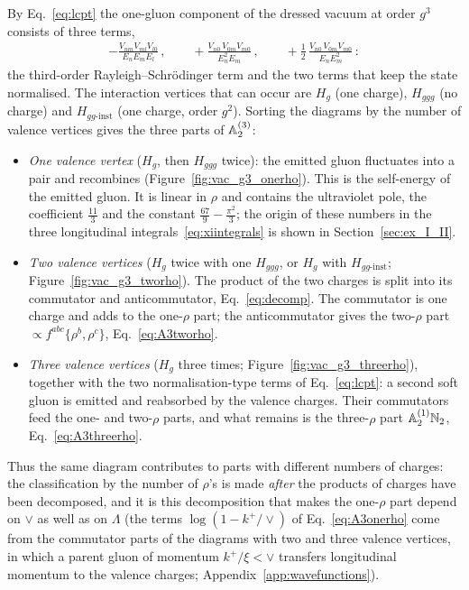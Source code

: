 By Eq.~\eqref{eq:lcpt} the one-gluon component of the dressed vacuum at order $g^3$ consists of three terms,
\begin{align}\label{eq:thirdorder}
-\frac{V_{nm}V_{ml}V_{l0}}{E_nE_mE_l}\,,\qquad+\frac{V_{n0}\,V_{0m}V_{m0}}{E_n^2E_m}\,,\qquad+\frac12\,\frac{V_{n0}\,V_{0m}V_{m0}}{E_nE_m^2}\,:
\end{align}
the third-order Rayleigh--Schr\"odinger term and the two terms that keep the state normalised. The interaction vertices that can occur are $H_g$ (one charge), $H_{ggg}$ (no charge) and $H_{gg\text{-inst}}$ (one charge, order $g^2$). Sorting the diagrams by the number of valence vertices gives the three parts of $\mathbb{A}^{(3)}_2$:
\begin{itemize}
\item \emph{One valence vertex} ($H_g$, then $H_{ggg}$ twice): the emitted gluon fluctuates into a pair and recombines (Figure~\ref{fig:vac_g3_onerho}). This is the self-energy of the emitted gluon. It is linear in $\rho$ and contains the ultraviolet pole, the coefficient $\frac{11}{3}$ and the constant $\frac{67}{9}-\frac{\pi^2}{3}$; the origin of these numbers in the three longitudinal integrals~\eqref{eq:xiintegrals} is shown in Section~\ref{sec:ex_I_II}.
\item \emph{Two valence vertices} ($H_g$ twice with one $H_{ggg}$, or $H_g$ with $H_{gg\text{-inst}}$; Figure~\ref{fig:vac_g3_tworho}). The product of the two charges is split into its commutator and anticommutator, Eq.~\eqref{eq:decomp}. The commutator is one charge and adds to the one-$\rho$ part; the anticommutator gives the two-$\rho$ part $\propto f^{abc}\{\rho^b,\rho^c\}$, Eq.~\eqref{eq:A3tworho}.
\item \emph{Three valence vertices} ($H_g$ three times; Figure~\ref{fig:vac_g3_threerho}), together with the two normalisation-type terms of Eq.~\eqref{eq:lcpt}: a second soft gluon is emitted and reabsorbed by the valence charges. Their commutators feed the one- and two-$\rho$ parts, and what remains is the three-$\rho$ part $\mathbb{A}^{(1)}_2\mathbb{N}_2$, Eq.~\eqref{eq:A3threerho}.
\end{itemize}
Thus the same diagram contributes to parts with different numbers of charges: the classification by the number of $\rho$'s is made \emph{after} the products of charges have been decomposed, and it is this decomposition that makes the one-$\rho$ part depend on $\vee$ as well as on $\Lambda$ (the terms $\log(1-k^+/\vee)$ of Eq.~\eqref{eq:A3onerho} come from the commutator parts of the diagrams with two and three valence vertices, in which a parent gluon of momentum $k^+/\xi<\vee$ transfers longitudinal momentum to the valence charges; Appendix~\ref{app:wavefunctions}).

